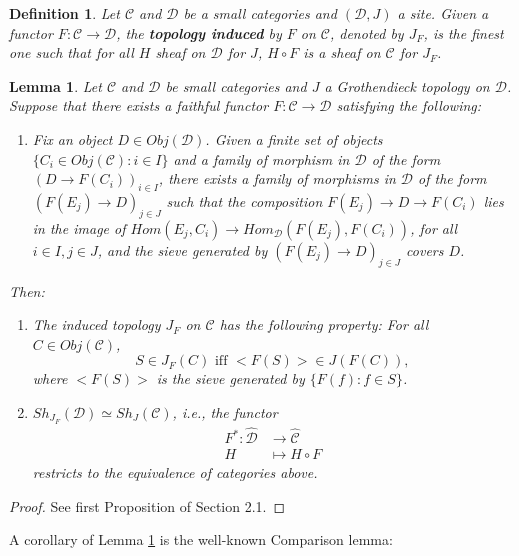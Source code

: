 \documentclass[10pt,a4paper]{amsart}
\newtheorem{Def}[Theo]{Definition}
\newtheorem{Lemma}[Theo]{Lemma}
\newcommand{\C}{\mathcal{C}}
\newcommand{\D}{\mathcal{D}}
\begin{document}
\begin{Def}
	Let $\C$ and $\D$ be a small categories and $(\D,J)$ a site. Given a functor $F: \C \to \D$, the \textbf{topology induced} by $F$ on $\C$, denoted by $J_{F}$, is the finest one such that for all $H$ sheaf on $\D$ for $J$, $H \circ F$ is a sheaf on $\C$ for $J_{F}$.
\end{Def}



\begin{Lemma}\label{BeilinsonLemma}
	Let $\C$ and $\D$ be  small categories and $J$ a Grothendieck topology on $\D$. Suppose that there exists a faithful functor $F: \C \to \D$ satisfying the following:
	\begin{enumerate}
		
		
		\item[] Fix an object $D \in Obj(\D)$. Given a finite set of objects $\{C_{i} \in Obj(\C): i \in I\}$ and a family of morphism in $\D$ of the form $(D \to F(C_{i}))_{i \in I}$, there exists a family of morphisms  in $\D$ of the form $(F(E_{j}) \to D)_{j \in J}$ such that the composition $F(E_{j}) \to D \to F(C_{i})$ lies in the image of $Hom(E_{j},C_{i}) \to Hom_{\D}(F(E_{j}),F(C_{i}))$, for all $i \in I, j \in J$, and the sieve generated by $(F(E_{j}) \to D)_{j \in J}$ covers $D$.
	\end{enumerate}
	Then:
	\begin{enumerate}
		\item The induced topology $J_{F}$ on $\C$ has the following property: For all $C \in Obj(\C)$,
		$$S \in J_{F}(C) \text{ iff } <F(S)> \in J(F(C)),$$
		where $<F(S)>$ is the sieve generated by $ \{F(f): f \in S\}$.
		
		\item $Sh_{J_{F}}(\D) \simeq Sh_{J}(\C)$, i.e., the functor
		\begin{align*}
				F^{*}:\widehat{\D} &\to \widehat{\C} \\
							H &\mapsto H \circ F
		\end{align*}
		restricts to the equivalence of categories above.
	\end{enumerate}
	
\end{Lemma}

\begin{proof}
	See \cite{Bei12} first Proposition of Section 2.1.
\end{proof}


A corollary of Lemma \ref{BeilinsonLemma} is the well-known Comparison lemma:
\end{document}

